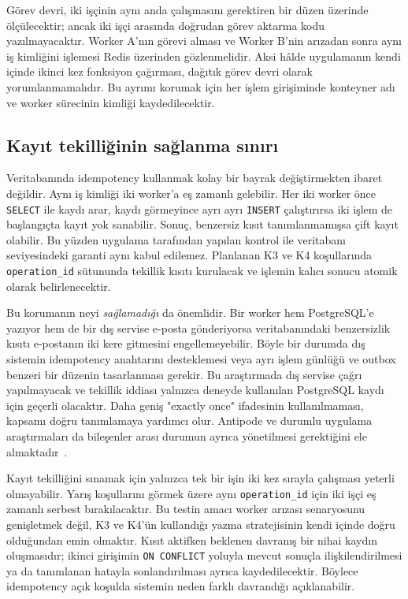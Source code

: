 \documentclass[conference,a4paper]{IEEEtran}
\newcommand{\code}[1]{\texttt{#1}}
\begin{document}
Görev devri, iki işçinin aynı anda çalışmasını gerektiren bir düzen üzerinde ölçülecektir; ancak iki işçi arasında doğrudan görev aktarma kodu yazılmayacaktır. Worker A'nın görevi alması ve Worker B'nin arızadan sonra aynı iş kimliğini işlemesi Redis üzerinden gözlenmelidir. Aksi hâlde uygulamanın kendi içinde ikinci kez fonksiyon çağırması, dağıtık görev devri olarak yorumlanmamalıdır. Bu ayrımı korumak için her işlem girişiminde konteyner adı ve worker sürecinin kimliği kaydedilecektir.

\subsection{Kayıt tekilliğinin sağlanma sınırı}
Veritabanında idempotency kullanmak kolay bir bayrak değiştirmekten ibaret değildir. Aynı iş kimliği iki worker'a eş zamanlı gelebilir. Her iki worker önce \code{SELECT} ile kaydı arar, kaydı görmeyince ayrı ayrı \code{INSERT} çalıştırırsa iki işlem de başlangıçta kayıt yok sanabilir. Sonuç, benzersiz kısıt tanımlanmamışsa çift kayıt olabilir. Bu yüzden uygulama tarafından yapılan kontrol ile veritabanı seviyesindeki garanti aynı kabul edilemez. Planlanan K3 ve K4 koşullarında \code{operation\_id} sütununda tekillik kısıtı kurulacak ve işlemin kalıcı sonucu atomik olarak belirlenecektir.

Bu korumanın neyi \emph{sağlamadığı} da önemlidir. Bir worker hem PostgreSQL'e yazıyor hem de bir dış servise e-posta gönderiyorsa veritabanındaki benzersizlik kısıtı e-postanın iki kere gitmesini engellemeyebilir. Böyle bir durumda dış sistemin idempotency anahtarını desteklemesi veya ayrı işlem günlüğü ve outbox benzeri bir düzenin tasarlanması gerekir. Bu araştırmada dış servise çağrı yapılmayacak ve tekillik iddiası yalnızca deneyde kullanılan PostgreSQL kaydı için geçerli olacaktır. Daha geniş "exactly once" ifadesinin kullanılmaması, kapsamı doğru tanımlamaya yardımcı olur. Antipode ve durumlu uygulama araştırmaları da bileşenler arası durumun ayrıca yönetilmesi gerektiğini ele almaktadır~\cite{loff2023,psarakis2024}.

Kayıt tekilliğini sınamak için yalnızca tek bir işin iki kez sırayla çalışması yeterli olmayabilir. Yarış koşullarını görmek üzere aynı \code{operation\_id} için iki işçi eş zamanlı serbest bırakılacaktır. Bu testin amacı worker arızası senaryosunu genişletmek değil, K3 ve K4'ün kullandığı yazma stratejisinin kendi içinde doğru olduğundan emin olmaktır. Kısıt aktifken beklenen davranış bir nihai kaydın oluşmasıdır; ikinci girişimin \code{ON CONFLICT} yoluyla mevcut sonuçla ilişkilendirilmesi ya da tanımlanan hatayla sonlandırılması ayrıca kaydedilecektir. Böylece idempotency açık koşulda sistemin neden farklı davrandığı açıklanabilir.
\end{document}
